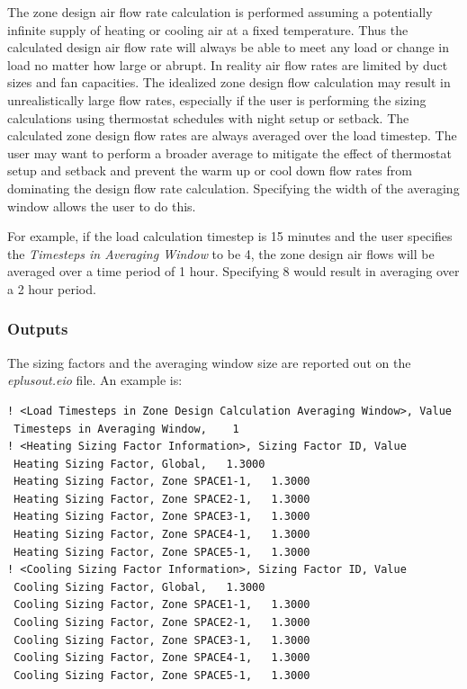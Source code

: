 The zone design air flow rate calculation is performed assuming a potentially infinite supply of heating or cooling air at a fixed temperature. Thus the calculated design air flow rate will always be able to meet any load or change in load no matter how large or abrupt. In reality air flow rates are limited by duct sizes and fan capacities. The idealized zone design flow calculation may result in unrealistically large flow rates, especially if the user is performing the sizing calculations using thermostat schedules with night setup or setback. The calculated zone design flow rates are always averaged over the load timestep. The user may want to perform a broader average to mitigate the effect of thermostat setup and setback and prevent the warm up or cool down flow rates from dominating the design flow rate calculation. Specifying the width of the averaging window allows the user to do this.

For example, if the load calculation timestep is 15 minutes and the user specifies the \emph{Timesteps in Averaging Window} to be 4, the zone design air flows will be averaged over a time period of 1 hour. Specifying 8 would result in averaging over a 2 hour period.

\subsubsection{Outputs}\label{outputs-009}

The sizing factors and the averaging window size are reported out on the \emph{eplusout.eio} file. An example is:

\begin{lstlisting}
! <Load Timesteps in Zone Design Calculation Averaging Window>, Value
 Timesteps in Averaging Window,    1
! <Heating Sizing Factor Information>, Sizing Factor ID, Value
 Heating Sizing Factor, Global,   1.3000
 Heating Sizing Factor, Zone SPACE1-1,   1.3000
 Heating Sizing Factor, Zone SPACE2-1,   1.3000
 Heating Sizing Factor, Zone SPACE3-1,   1.3000
 Heating Sizing Factor, Zone SPACE4-1,   1.3000
 Heating Sizing Factor, Zone SPACE5-1,   1.3000
! <Cooling Sizing Factor Information>, Sizing Factor ID, Value
 Cooling Sizing Factor, Global,   1.3000
 Cooling Sizing Factor, Zone SPACE1-1,   1.3000
 Cooling Sizing Factor, Zone SPACE2-1,   1.3000
 Cooling Sizing Factor, Zone SPACE3-1,   1.3000
 Cooling Sizing Factor, Zone SPACE4-1,   1.3000
 Cooling Sizing Factor, Zone SPACE5-1,   1.3000
\end{lstlisting}

